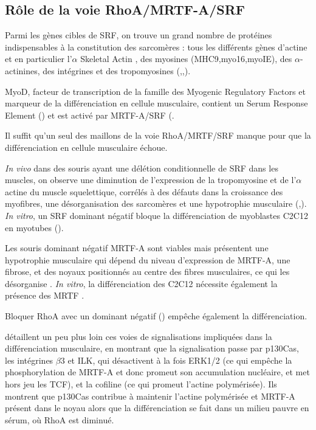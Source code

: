 \documentclass{report}
\begin{document}
\subsection{Rôle de la voie RhoA/MRTF-A/SRF}

Parmi les gènes cibles de SRF, on trouve un grand nombre de protéines indispensables à la constitution des sarcomères :  tous les différents gènes d'actine et en particulier l'$\alpha$ Skeletal Actin , des myosines (MHC9,myo16,myoIE), des $\alpha$-actinines, des intégrines et des tropomyosines (\cite{selvaraj_megakaryoblastic_2003},\cite{charvet_new_2006},\cite{esnault_rho-actin_2014}).

MyoD, facteur de transcription de la famille des Myogenic Regulatory Factors et marqueur de la différenciation en cellule musculaire, contient un Serum Response Element (\cite{lhonore_myod_2003}) et est activé par MRTF-A/SRF (\cite{mokalled_mastr_2012}. 

Il suffit qu'un seul des maillons de la voie RhoA/MRTF/SRF manque pour que la différenciation en cellule musculaire échoue. 

\textit{In vivo} dans des souris ayant une délétion conditionnelle de SRF dans les muscles, on observe une diminution de l'expression de la tropomyosine et de l'$\alpha$ actine du muscle squelettique, corrélés à des défauts dans la croissance des myofibres, une désorganisation des sarcomères et une hypotrophie musculaire (\cite{charvet_new_2006},\cite{li_requirement_2005}). \textit{In vitro}, un SRF dominant négatif bloque la différenciation de myoblastes C2C12 en myotubes (\cite{wei_rhoa_1998}).

Les souris dominant négatif MRTF-A sont viables mais présentent une hypotrophie musculaire qui dépend du niveau d'expression de MRTF-A, une fibrose, et des noyaux positionnés au centre des fibres musculaires, ce qui les désorganise \cite{li_requirement_2005}. \textit{In vitro}, la différenciation des C2C12 nécessite également la présence des MRTF \cite{selvaraj_megakaryoblastic_2003}. 

Bloquer RhoA avec un dominant négatif (\cite{wei_rhoa_1998}) empêche également la différenciation.

\cite{kawauchi_p130cas-dependent_2012} détaillent un peu plus loin ces voies de signalisations impliquées dans la différenciation musculaire, en montrant que la signalisation passe par p130Cas, les intégrines $\beta$3 et ILK, qui désactivent à la fois ERK1/2 (ce qui empêche la phosphorylation de MRTF-A et donc promeut son accumulation nucléaire, et met hors jeu les TCF), et la cofiline (ce qui promeut l'actine polymérisée). Ils montrent que p130Cas contribue à maintenir l'actine polymérisée et MRTF-A présent dans le noyau alors que la différenciation se fait dans un milieu pauvre en sérum, où RhoA est diminué. 
 
\end{document}
